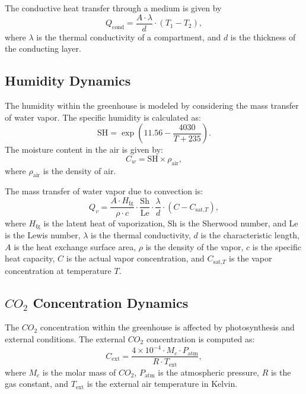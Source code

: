 \documentclass[conference]{IEEEtran}
\begin{document}
The conductive heat transfer through a medium is given by
\begin{equation}
    Q_{\text{cond}} = \frac{A \cdot \lambda}{d} \cdot (T_1 - T_2),
\end{equation}
where $\lambda$ is the thermal conductivity of a compartment, and $d$ is the thickness of the conducting layer.

\subsection{Humidity Dynamics}

The humidity within the greenhouse is modeled by considering the mass transfer of water vapor. The specific humidity is calculated as:
\begin{equation}
    \text{SH} = \exp\left(11.56 - \frac{4030}{T + 235}\right).
\end{equation}
The moisture content in the air is given by:
\begin{equation}
    C_w = \text{SH} \times \rho_{\text{air}},
\end{equation}
where $\rho_{\text{air}}$ is the density of air.

The mass transfer of water vapor due to convection is:
\begin{equation}
    Q_{v} = \frac{A \cdot H_{\text{fg}}}{\rho \cdot c} \cdot \frac{\text{Sh}}{\text{Le}} \cdot \frac{\lambda}{d} \cdot \left( C - C_{\text{sat,}T} \right),
\end{equation}
where $H_{\text{fg}}$ is the latent heat of vaporization, $\text{Sh}$ is the Sherwood number, and $\text{Le}$ is the Lewis number, $\lambda$ is the thermal conductivity, $d$ is the characteristic length, $A$ is the heat exchange surface area, $\rho$ is the density of the vapor, $c$ is the specific heat capacity, $C$ is the actual vapor concentration, and $C_{\text{sat,}T}$ is the vapor concentration at temperature $T$.

\subsection{$CO_2$ Concentration Dynamics}

The $CO_2$ concentration within the greenhouse is affected by photosynthesis and external conditions. The external $CO_2$ concentration is computed as:
\begin{equation}
    C_{\text{ext}} = \frac{4 \times 10^{-4} \cdot M_c \cdot P_{\text{atm}}}{R \cdot T_{\text{ext}}},
\end{equation}
where $M_c$ is the molar mass of $CO_2$, $P_{\text{atm}}$ is the atmospheric pressure, $R$ is the gas constant, and $T_{\text{ext}}$ is the external air temperature in Kelvin.
\end{document}
